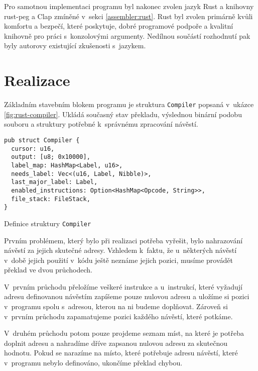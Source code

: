 Pro samotnou implementaci programu byl nakonec zvolen jazyk Rust a kni\-hov\-ny rust-peg a Clap zmíněné v~sekci \ref{assembler:rust}. Rust byl zvolen primárně kvůli komfortu a bezpečí, které poskytuje, dobré programové podpoře a kvalitní knihovně pro práci s~konzolovými argumenty. Nedílnou součástí rozhodnutí pak byly autorovy existující zkušenosti s~jazykem.

\section{Realizace}

Základním stavebním blokem programu je struktura \texttt{Compiler} popsaná v~u\-káz\-ce \ref{fig:rust-compiler}. Ukládá současný stav překladu, výslednou binární podobu souboru a struktury potřebné k~správnému zpracování návěstí.

\begin{listing}[htbp]
\begin{verbatim}
pub struct Compiler {
  cursor: u16,
  output: [u8; 0x10000],
  label_map: HashMap<Label, u16>,
  needs_label: Vec<(u16, Label, Nibble)>,
  last_major_label: Label,
  enabled_instructions: Option<HashMap<Opcode, String>>,
  file_stack: FileStack,
}
\end{verbatim}
\caption{Definice struktury \texttt{Compiler}}
\label{fig:rust-compiler}
\end{listing}

Prvním problémem, který bylo při realizaci potřeba vyřešit, bylo nahrazování návěstí za jejich skutečné adresy. Vzhledem k~faktu, že u~některých návěstí v~době jejich použití v~kódu ještě neznáme jejich pozici, musíme provádět překlad ve dvou průchodech.

V~prvním průchodu přeložíme veškeré instrukce a u~instrukcí, které vy\-ža\-du\-jí adresu definovanou návěstím zapíšeme pouze nulovou adresu a uložíme si pozici v~programu spolu s~adresou, kterou na ni budeme doplňovat. Zároveň si v~prvním průchodu zapamatujeme pozici každého návěstí, které potkáme.

V~druhém průchodu potom pouze projdeme seznam míst, na které je potřeba doplnit adresu a nahradíme dříve zapsanou nulovou adresu za sku\-teč\-nou hodnotu. Pokud se narazíme na místo, které potřebuje adresu návěstí, které v~programu nebylo definováno, ukončíme překlad chybou.

